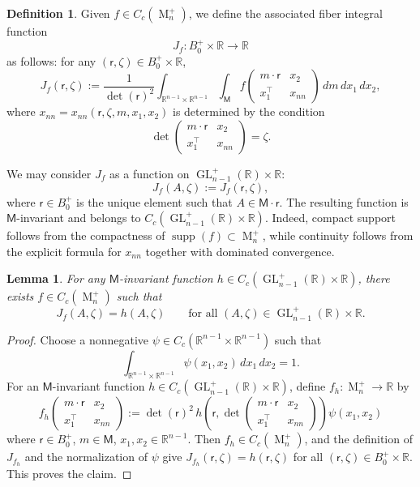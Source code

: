 \documentclass[reqno,11pt]{amsart}
\numberwithin{equation}{section}
\newtheorem{lemma}[theorem]{Lemma}
\theoremstyle{definition}
\newtheorem{definition}[theorem]{Definition}
\theoremstyle{remark}
\newcommand{\op}{\operatorname}
\newcommand{\be}{\begin{equation}}
\newcommand{\ee}{\end{equation}}
\newcommand{\R}{\mathbb R}
\newcommand{\br}{\mathbb R}
\newcommand{\M}{\op{M}}
\newcommand{\bp}{B_0^+}
\newcommand{\GL}{\op{GL}}
\renewcommand{\r}{\mathsf r}
\begin{document}
\begin{definition}\label{fiberi} Given $f\in C_c({\M_n^+})$,  we define the associated fiber integral function
$$J_f: B_0^+ \times \R\to \R$$ as follows: for any $ (\r ,\zeta)\in \bp\times  \R$,
$$
J_f(\r ,\zeta)
:=
\frac{1}{\det(\r)^2}
\int_{\R^{n-1}\times \R^{n-1}}\int_{\mathsf M}
f\begin{pmatrix}
m\cdot \r & x_2\\
x_1^{\intercal} & x_{nn}
\end{pmatrix}
\, dm \, dx_1\,dx_2,
$$
where $x_{nn}=x_{nn}(\r,\zeta, m,x_1,x_2)$ is determined by the condition
$$
\det\begin{pmatrix}
m\cdot \r & x_2\\
x_1^{\intercal} & x_{nn}
\end{pmatrix}
=\zeta.
$$
\end{definition}
We may consider $J_f$ as a function on $\GL_{n-1}^+(\R)\times \br$:
$$J_f(A,\zeta):=J_f(\r,\zeta),$$ where $\r\in B_0^+$ is the unique element such that $A\in \mathsf M\cdot\r$. The resulting function is $\mathsf M$-invariant and belongs to
$C_c(\GL_{n-1}^+(\mathbb R)\times\mathbb R)$. Indeed, compact support
follows from the compactness of $\operatorname{supp}(f)\subset\M_n^+$, while continuity
follows from the explicit formula for $x_{nn}$ together with dominated
convergence.


\begin{lemma}\label{lem:Jf-surjective}
For any $\mathsf M$-invariant function
$h\in C_c(\GL_{n-1}^+(\br)\times \R)$, there exists
$f\in C_c(\M_n^+)$ such that
$$
J_f(A,\zeta)=h(A,\zeta)
\qquad
\text{for all }(A,\zeta)\in \GL_{n-1}^+(\br)\times \R.
$$
\end{lemma}

\begin{proof}
Choose a nonnegative $\psi\in C_c(\R^{n-1}\times\R^{n-1})$ such that
$$
\int_{\R^{n-1}\times\R^{n-1}}\psi(x_1,x_2)\,dx_1\,dx_2=1.
$$
For an $\mathsf M$-invariant function
$h\in C_c(\GL_{n-1}^+(\br)\times \R)$, define $f_h:\M_n^+\to \br$ by
\be\label{fh}
f_h\begin{pmatrix}
m\cdot \r & x_2\\
x_1^{\intercal} & x_{nn}
\end{pmatrix}
:=
\det(\r)^2\,h\!\left(\r,
\det\begin{pmatrix}
m\cdot \r & x_2\\
x_1^{\intercal} & x_{nn}
\end{pmatrix}\right)\psi(x_1,x_2)
\ee where $\r\in B_0^+$, $m\in\mathsf M$, $x_1, x_2\in \br^{n-1}$.
Then $f_h\in C_c(\M_n^+)$, and the definition of $J_{f_h}$ and the normalization of $\psi$ give
$J_{f_h}(\r,\zeta)=h(\r,\zeta)$ for all $(\r, \zeta)\in B_0^+\times \br$. This proves the claim.
\end{proof}
\end{document}
